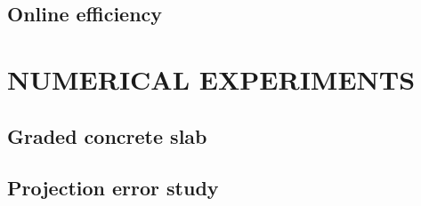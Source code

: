 \documentclass[a4paper]{eccomas_paper-2024}
\begin{document}

\subsection{Online efficiency} %
\label{sub:Online efficiency}


\section{NUMERICAL EXPERIMENTS} %
\label{sec:numerical experiments}


\subsection{Graded concrete slab} %
\label{sub:Graded concrete slab}

%
%
%

\subsection{Projection error study} %
\label{sub:Projection error study}
\end{document}

